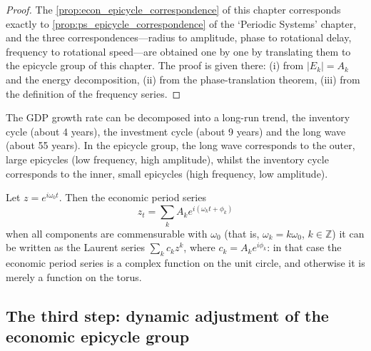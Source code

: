 \begin{proof}
The \cref{prop:econ_epicycle_correspondence} of this chapter corresponds exactly to \cref{prop:ps_epicycle_correspondence} of the `Periodic Systems' chapter,
and the three correspondences---radius to amplitude, phase to rotational delay, frequency to rotational speed---are obtained one by one by translating them to the epicycle group of this chapter.
The proof is given there: (i) from $|E_k|=A_k$ and the energy decomposition, (ii) from the phase-translation theorem, (iii) from the definition of the frequency series.
\end{proof}

\begin{example}\label{ex:econ_series_example}
The GDP growth rate can be decomposed into a long-run trend, the inventory cycle (about 4 years), the investment cycle (about 9 years) and the long wave (about 55 years). In the epicycle group, the long wave corresponds to the outer, large epicycles (low frequency, high amplitude), whilst the inventory cycle corresponds to the inner, small epicycles (high frequency, low amplitude).
\end{example}

\begin{remark}\label{rem:econ_series_complex}
Let $z=e^{i\omega_0t}$. Then the economic period series
\[
z_t=\sum_k A_k e^{i(\omega_k t+\phi_k)}
\]
when all components are commensurable with $\omega_0$ (that is, $\omega_k=k\omega_0$, $k\in\mathbb Z$) it can be written as the Laurent series $\sum_k c_k z^k$, where $c_k=A_k e^{i\phi_k}$: in that case the economic period series is a complex function on the unit circle, and otherwise it is merely a function on the torus.
\end{remark}

\subsection{The third step: dynamic adjustment of the economic epicycle group}

